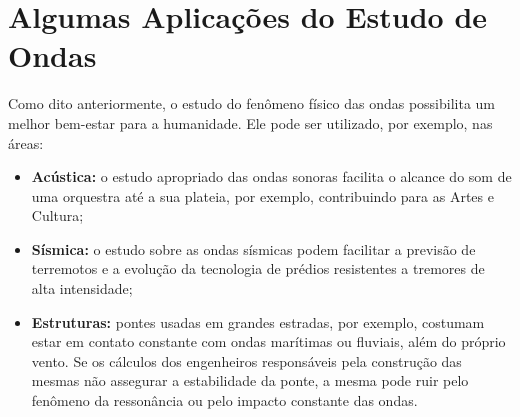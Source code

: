 	\section{Algumas Aplicações do Estudo de Ondas}
		Como dito anteriormente, o estudo do fenômeno físico das ondas possibilita um melhor bem-estar para a humanidade. Ele pode ser utilizado, por exemplo, nas áreas:
		\begin{itemize}
			\item\textbf{Acústica: }o estudo apropriado das ondas sonoras facilita o alcance do som de uma orquestra até a sua plateia, por exemplo, contribuindo para as Artes e Cultura;
			
			\item\textbf{Sísmica: }o estudo sobre as ondas sísmicas podem facilitar a previsão de terremotos e a evolução da tecnologia de prédios resistentes a tremores de alta intensidade;
			
			\item\textbf{Estruturas: }pontes usadas em grandes estradas, por exemplo, costumam estar em contato constante com ondas marítimas ou fluviais, além do próprio vento. Se os cálculos dos engenheiros responsáveis pela construção das mesmas não assegurar a estabilidade da ponte, a mesma pode ruir pelo fenômeno da ressonância ou pelo impacto constante das ondas.
			
		\end{itemize}

